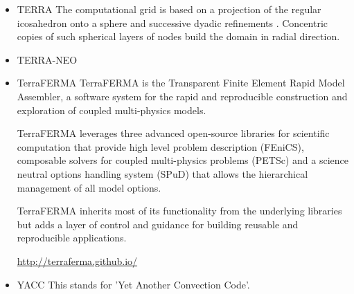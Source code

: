 \begin{itemize}
\item {\codefont TERRA} 
The computational grid is based on a projection of the regular icosahedron onto a 
sphere and successive dyadic refinements \cite{bafr85}.  Concentric copies of such  
spherical layers of nodes build the domain in radial direction.

{\small
\noindent
\cite{baum83}
\cite{buri96}
\cite{glat88}
\cite{tasg93}
\cite{tasg94}
\cite{buba95}
\cite{burb97}\cite{yang97}
\cite{burl98}
\cite{tabg99}
\cite{phbs09}\cite{wodd09}\cite{gows09}
\cite{yayh10}
\cite{woda11}\cite{iahb11}
\cite{dagd12}\cite{shbs12}
\cite{dadb13}
\cite{vade16}
\cite{woda17}
}

\item {\codefont TERRA-NEO} 

\cite{wegg15}


\item {\codefont TerraFERMA} 
TerraFERMA is the Transparent Finite Element Rapid Model Assembler, a software system for the rapid and reproducible construction and exploration of coupled multi-physics models.

TerraFERMA leverages three advanced open-source libraries for scientific computation that provide high level problem description (FEniCS), composable solvers for coupled multi-physics problems (PETSc) and a science neutral options handling system (SPuD) that allows the hierarchical management of all model options.

TerraFERMA inherits most of its functionality from the underlying libraries but adds a layer of control and guidance for building reusable and reproducible applications.

\url{http://terraferma.github.io/}

{\small
\noindent
\cite{wisv14}
\cite{wisv17}
\cite{spmw16}
\cite{ceww17}
\cite{ceww19}
}

\item {\codefont YACC} 
This stands for 'Yet Another Convection Code'.


\end{itemize}
